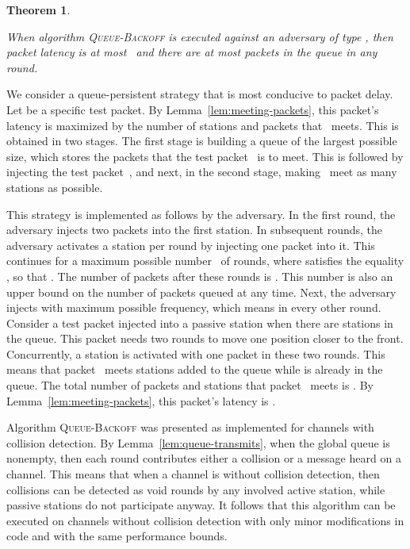 \documentclass[11pt]{article}
\newcommand{\qed}{\hfill  \smallbreak}
\newenvironment{proof}{\noindent{\bf Proof:}}{\qed}
\newtheorem{theorem}{Theorem}
\begin{document}
\begin{theorem}
\label{thm:queue-algorithm}

When algorithm \textsc{Queue-Backoff} is executed against an adversary of type , then packet latency is at most~ and there are at most  packets in the queue in any round.
\end{theorem}

\begin{proof} 
We consider a queue-persistent strategy that is most conducive to packet delay.
Let  be a specific test packet.
By Lemma~\ref{lem:meeting-packets}, this packet's latency is maximized by the number of stations and packets that~ meets.
This is obtained in two stages.
The first stage is building a queue of the largest possible size, which stores the packets that the test packet~ is to meet.
This is followed by injecting the test packet~, and next, in the second stage, making~ meet as many stations as possible.

This strategy is implemented as follows by the adversary.
In the first round, the adversary injects two packets into the first station.
In subsequent rounds, the adversary activates a station per round by injecting one packet into it.
This continues for a maximum possible number~ of rounds, where  satisfies the equality , so that .
The number of packets  after these  rounds is . 
This number  is also an upper bound on the number of packets queued at any time.
Next, the adversary injects with maximum possible frequency, which means in every other round.
Consider a test packet  injected into a passive station when there are  stations in the queue.
This packet  needs two rounds to move one position closer to the front.
Concurrently, a station is activated with one packet in these two rounds.
This means that packet~ meets  stations added to the queue while  is already in the queue.
The total number of packets and stations that packet~ meets is .
By Lemma~\ref{lem:meeting-packets}, this packet's latency is . 
\end{proof} 



Algorithm \textsc{Queue-Backoff} was presented as implemented for channels with collision detection.
By Lemma~\ref{lem:queue-transmits}, when the global queue is nonempty, then each round contributes either a collision or a message heard on a channel.
This means that when a channel is without collision detection, then collisions can be detected as void rounds by any involved active station, while passive stations do not participate anyway.
It follows that this algorithm can be executed on channels without collision detection with only minor modifications in code and with the same performance bounds.
\end{document}
